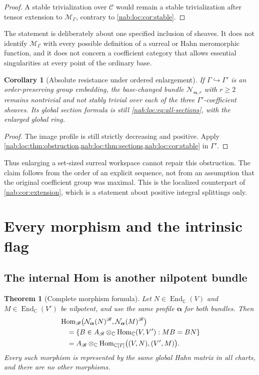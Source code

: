 \documentclass[11pt,letterpaper]{article}
\newtheorem{theorem}{Theorem}[section]
\newtheorem{corollary}[corollary]{Corollary}
\theoremstyle{definition}
\theoremstyle{remark}
\newcommand{\C}{\mathbb C}
\newcommand{\MM}{\mathscr M_\Gamma}
\newcommand{\BB}{\mathscr B}
\newcommand{\Aglob}{A_{\BB}}
\newcommand{\Hom}{\operatorname{Hom}}
\newcommand{\End}{\operatorname{End}}
\newcommand{\profile}{\boldsymbol\alpha}
\newcommand{\NN}[1]{\mathcal N_{\profile,#1}}
\numberwithin{equation}{section}
\begin{document}
\begin{proof}
A stable trivialization over $\mathscr C$ would remain a stable trivialization
after tensor extension to $\MM$, contrary to \cref{nab:loc:cor:stable}.
\end{proof}

The statement is deliberately about one specified inclusion of sheaves. It
does not identify $\MM$ with every possible definition of a surreal or Hahn
meromorphic function, and it does not concern a coefficient category that
allows essential singularities at every point of the ordinary base.

\begin{corollary}[Absolute resistance under ordered enlargement]\label{nab:loc:cor:enlarge}
If $\Gamma\hookrightarrow\Gamma'$ is an order-preserving group embedding, the
base-changed bundle $\NN r$ with $r\geq2$ remains nontrivial and not stably
trivial over each of the three $\Gamma'$-coefficient sheaves. Its global section
formula is still \eqref{nab:loc:eq:all-sections}, with the enlarged global
ring.
\end{corollary}

\begin{proof}
The image profile is still strictly decreasing and positive. Apply
\cref{nab:loc:thm:obstruction,nab:loc:thm:sections,nab:loc:cor:stable} in
$\Gamma'$.
\end{proof}

Thus enlarging a set-sized surreal workspace cannot repair this obstruction. The
claim follows from the order of an explicit sequence, not from an assumption
that the original coefficient group was maximal. This is the localized
counterpart of \cref{nab:cor:extension}, which is a statement about positive
integral splittings only.

\section{Every morphism and the intrinsic flag}\label{nab:loc:sec:morphisms}

\subsection{The internal Hom is another nilpotent bundle}

\begin{theorem}[Complete morphism formula]\label{nab:loc:thm:hom}
Let $N\in\End_\C(V)$ and $M\in\End_\C(V')$ be nilpotent, and use the same
profile $\profile$ for both bundles. Then
\begin{align}
 &\Hom_{\BB}\bigl(\mathcal N_{\profile}(N)^{\BB},\mathcal N_{\profile}(M)^{\BB}\bigr)\notag\\
 &\hspace{1em}=\{B\in\Aglob\otimes_\C\Hom_\C(V,V'):MB=BN\}\notag\\
 &\hspace{1em}=\Aglob\otimes_\C\Hom_{\C[T]}\bigl((V,N),(V',M)\bigr).
 \label{nab:loc:eq:hom-formula}
\end{align}
Every such morphism is represented by the same global Hahn matrix in all
charts, and there are no other morphisms.
\end{theorem}
\end{document}

